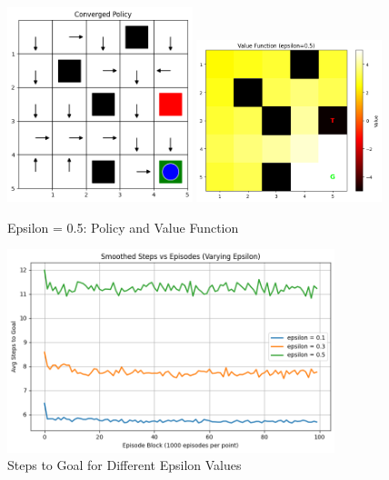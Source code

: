 \documentclass[12pt]{article}
\begin{document}
\begin{figure}[htbp]
  \centering
  \includegraphics[width=0.48\textwidth]{images/part1_q3_epsilon_0.5_policy.png}
  \includegraphics[width=0.48\textwidth]{images/part1_q3_epsilon_0.5_value.png}
  \caption{Epsilon = 0.5: Policy and Value Function}
\end{figure}

\begin{figure}[H]
  \centering
  \includegraphics[width=0.85\textwidth]{images/part1_q3_steps_vs_epsilon.png}
  \caption{Steps to Goal for Different Epsilon Values}
\end{figure}
\end{document}
